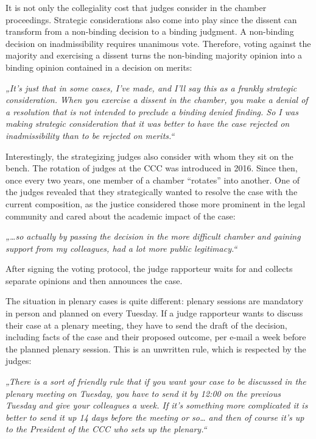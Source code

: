\documentclass[
  11pt,
]{article}
\begin{document}
It is not only the collegiality cost that judges consider in the chamber proceedings. Strategic considerations also come into play since the dissent can transform from a non-binding decision to a binding judgment. A non-binding decision on inadmissibility requires unanimous vote. Therefore, voting against the majority and exercising a dissent turns the non-binding majority opinion into a binding opinion contained in a decision on merits:

\emph{„It's just that in some cases, I've made, and I'll say this as a frankly strategic consideration. When you exercise a dissent in the chamber, you make a denial of a resolution that is not intended to preclude a binding denied finding. So I was making strategic consideration that it was better to have the case rejected on inadmissibility than to be rejected on merits.``}

Interestingly, the strategizing judges also consider with whom they sit on the bench. The rotation of judges at the CCC was introduced in 2016. Since then, once every two years, one member of a chamber ``rotates'' into another. One of the judges revealed that they strategically wanted to resolve the case with the current composition, as the justice considered those more prominent in the legal community and cared about the academic impact of the case:

\emph{„\ldots so actually by passing the decision in the more difficult chamber and gaining support from my colleagues, had a lot more public legitimacy.``}

After signing the voting protocol, the judge rapporteur waits for and collects separate opinions and then announces the case.

The situation in plenary cases is quite different: plenary sessions are mandatory in person and planned on every Tuesday. If a judge rapporteur wants to discuss their case at a plenary meeting, they have to send the draft of the decision, including facts of the case and their proposed outcome, per e-mail a week before the planned plenary session. This is an unwritten rule, which is respected by the judges:

\emph{„There is a sort of friendly rule that if you want your case to be discussed in the plenary meeting on Tuesday, you have to send it by 12:00 on the previous Tuesday and give your colleagues a week. If it's something more complicated it is better to send it up 14 days before the meeting or so\ldots{} and then of course it's up to the President of the CCC who sets up the plenary.``}
\end{document}
